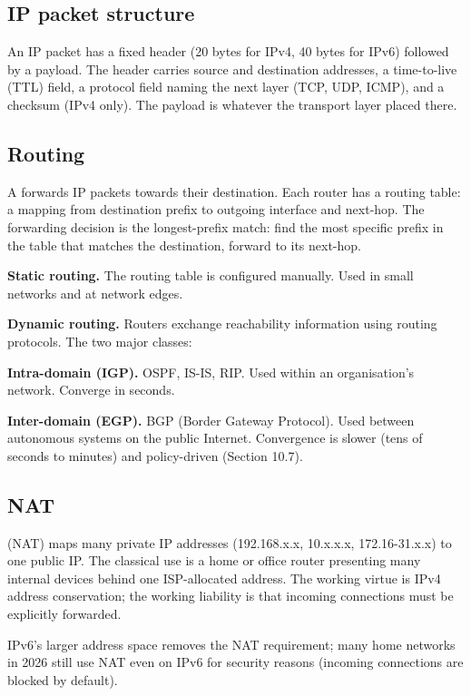 \subsection{IP packet structure}

An IP packet has a fixed header (20 bytes for IPv4, 40 bytes for IPv6) followed by a payload. The header carries source and destination addresses, a time-to-live (TTL) field, a protocol field naming the next layer (TCP, UDP, ICMP), and a checksum (IPv4 only). The payload is whatever the transport layer placed there.

\subsection{Routing}

A  forwards IP packets towards their destination. Each router has a routing table: a mapping from destination prefix to outgoing interface and next-hop. The forwarding decision is the longest-prefix match: find the most specific prefix in the table that matches the destination, forward to its next-hop.

\textbf{Static routing.} The routing table is configured manually. Used in small networks and at network edges.

\textbf{Dynamic routing.} Routers exchange reachability information using routing protocols. The two major classes:

\textbf{Intra-domain (IGP).} OSPF, IS-IS, RIP. Used within an organisation's network. Converge in seconds.

\textbf{Inter-domain (EGP).} BGP (Border Gateway Protocol). Used between autonomous systems on the public Internet. Convergence is slower (tens of seconds to minutes) and policy-driven (Section 10.7).

\subsection{NAT}

 (NAT) maps many private IP addresses (192.168.x.x, 10.x.x.x, 172.16-31.x.x) to one public IP. The classical use is a home or office router presenting many internal devices behind one ISP-allocated address. The working virtue is IPv4 address conservation; the working liability is that incoming connections must be explicitly forwarded.

IPv6's larger address space removes the NAT requirement; many home networks in 2026 still use NAT even on IPv6 for security reasons (incoming connections are blocked by default).

